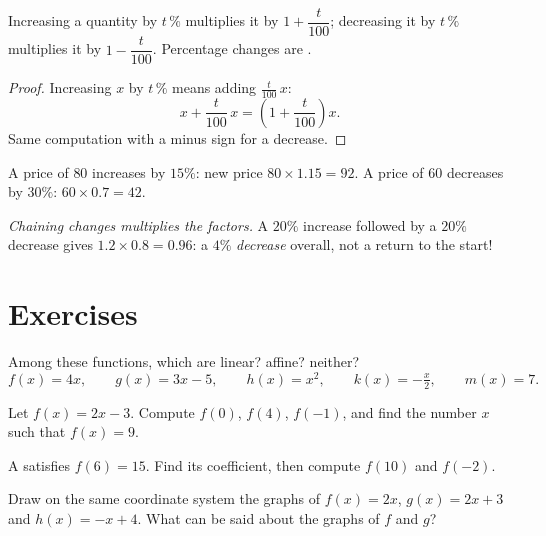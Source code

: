 \begin{proposition}\label{prop:g9:linfunc:percent}
Increasing a quantity by $t\,\%$ multiplies it by
$1 + \dfrac{t}{100}$; decreasing it by $t\,\%$ multiplies it by
$1 - \dfrac{t}{100}$. Percentage changes are .
\end{proposition}

\begin{proof}
Increasing $x$ by $t\,\%$ means adding $\frac{t}{100}\,x$:
\[
x + \frac{t}{100}\,x = \left(1 + \frac{t}{100}\right) x .
\]
Same computation with a minus sign for a decrease.
\end{proof}

\begin{example}\label{ex:g9:linfunc:percent}
A price of $80$ increases by $15\%$: new price
$80 \times 1.15 = 92$. A price of $60$ decreases by $30\%$:
$60 \times 0.7 = 42$.

\emph{Chaining changes multiplies the factors.} A $20\%$ increase
followed by a $20\%$ decrease gives
$1.2 \times 0.8 = 0.96$: a $4\%$ \emph{decrease} overall, not a return to
the start!
\end{example}

\section{Exercises}

\begin{exercise}[$\star$]\label{exo:g9:linfunc:1}
Among these functions, which are linear? affine? neither?
\[
f(x) = 4x, \qquad
g(x) = 3x - 5, \qquad
h(x) = x^2, \qquad
k(x) = -\tfrac x2, \qquad
m(x) = 7 .
\]
\end{exercise}

\begin{exercise}[$\star$]\label{exo:g9:linfunc:2}
Let $f(x) = 2x - 3$. Compute $f(0)$, $f(4)$, $f(-1)$, and find the number
$x$ such that $f(x) = 9$.
\end{exercise}

\begin{exercise}[$\star$]\label{exo:g9:linfunc:3}
A  satisfies $f(6) = 15$. Find its coefficient, then
compute $f(10)$ and $f(-2)$.
\end{exercise}

\begin{exercise}[$\star$]\label{exo:g9:linfunc:4}
Draw on the same coordinate system the graphs of $f(x) = 2x$,
$g(x) = 2x + 3$ and $h(x) = -x + 4$. What can be said about the graphs of
$f$ and $g$?
\end{exercise}

